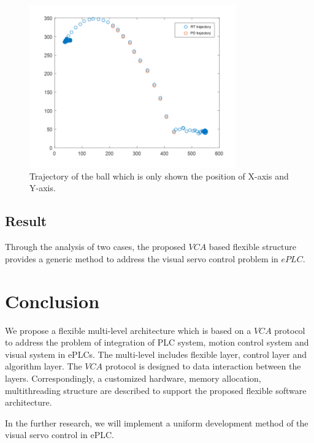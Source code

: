 \documentclass[journal,UTF8]{IEEEtran}
\begin{document}
\begin{figure}
	\centering
	\includegraphics[width=3.5in]{fig/PFofRobot.pdf}
	\caption{ Trajectory of the ball which is only shown the position of X-axis and Y-axis.}
	\label{fig:Trajectory}
\end{figure}

\subsection{Result}
Through the analysis of two cases, the proposed $VCA$ based flexible structure provides a generic method to address the visual servo control problem in $ePLC$.  
\section{Conclusion}
\label{conclusion}
We propose a flexible multi-level architecture which is based on a $VCA$ protocol to address the problem of integration of PLC system, motion control system and visual system in ePLCs. The multi-level includes flexible layer, control layer and algorithm layer. The $VCA$ protocol is designed to data interaction between the layers. Correspondingly, a customized hardware, memory allocation, multithreading structure are described to support the proposed flexible software architecture.

In the further research, we will implement a uniform development method of the visual servo control in ePLC.

\ifCLASSOPTIONcaptionsoff
  \newpage
\fi



\end{document}
